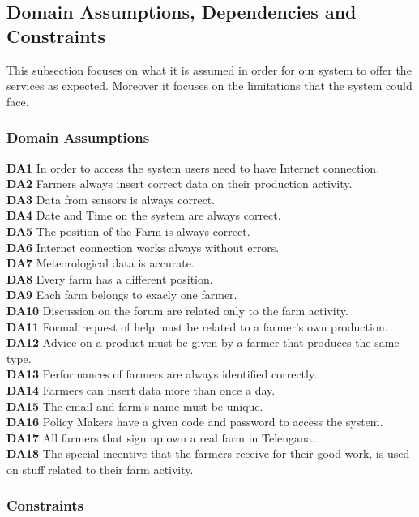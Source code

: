 \subsection{Domain Assumptions, Dependencies and Constraints}
This subsection focuses on what it is assumed in order for our system to offer the services as expected.
Moreover it focuses on the limitations that the system could face.

\subsubsection{Domain Assumptions}
\textbf{DA1} In order to access the system users need to have Internet connection.\\
\textbf{DA2} Farmers always insert correct data on their production activity.\\
\textbf{DA3} Data from sensors is always correct.\\
\textbf{DA4} Date and Time on the system are always correct.\\
\textbf{DA5} The position of the Farm is always correct.\\
\textbf{DA6} Internet connection works always without errors.\\
\textbf{DA7} Meteorological data is accurate.\\
\textbf{DA8} Every farm has a different position.\\
\textbf{DA9} Each farm belongs to exacly one farmer.\\
\textbf{DA10} Discussion on the forum are related only to the farm activity.\\
\textbf{DA11} Formal request of help must be related to a farmer's own production.\\
\textbf{DA12} Advice on a product must be given by a farmer that produces the same type.\\
\textbf{DA13} Performances of farmers are always identified correctly.\\
\textbf{DA14} Farmers can insert data more than once a day.\\
\textbf{DA15} The email and farm's name must be unique.\\
\textbf{DA16} Policy Makers have a given code and password to access the system.\\
\textbf{DA17} All farmers that sign up own a real farm in Telengana.\\
\textbf{DA18} The special incentive that the farmers receive for their good work, is used on stuff related to their farm activity.\\


\subsubsection{Constraints}